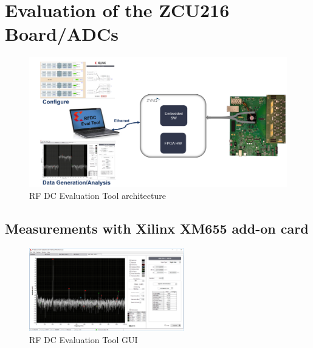 \section{Evaluation of the ZCU216 Board/ADCs}

\begin{figure}[H]
	\centering
	\includegraphics[width = \textwidth]{chap/05-characterization/img/zcu216evaltool.png}
	\caption{RF DC Evaluation Tool architecture \cite{zcu216evaltool}}
	\label{fig:evaltool}
\end{figure}


\subsection{Measurements with Xilinx XM655 add-on card}
\begin{figure}[H]
	\centering
	\includegraphics[width = 0.6\textwidth]{chap/05-characterization/img/evaltool.png}
	\caption{RF DC Evaluation Tool GUI \cite{zcu216evaltool}}
	\label{fig:evalgui}
\end{figure}


